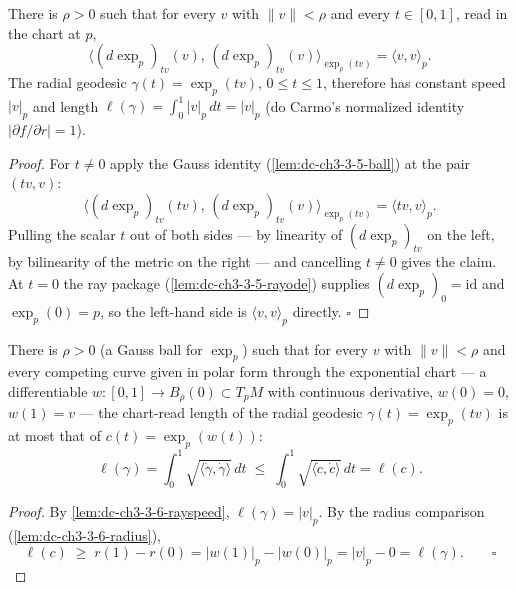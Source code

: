 \begin{lemma}
  \label{lem:dc-ch3-3-6-rayspeed}
  \leanok
  There is $\rho>0$ such that for every $v$ with $\|v\|<\rho$ and every
  $t\in[0,1]$, read in the chart at $p$,
  $$\big\langle(d\exp_p)_{tv}(v),\,(d\exp_p)_{tv}(v)\big\rangle_{\exp_p(tv)}
    =\langle v,v\rangle_p.$$
  The radial geodesic $\gamma(t)=\exp_p(tv)$, $0\le t\le1$, therefore has
  constant speed $|v|_p$ and length
  $\ell(\gamma)=\int_0^1|v|_p\,dt=|v|_p$ (do Carmo's normalized identity
  $|\partial f/\partial r|=1$).
\end{lemma}
\begin{proof}
  \leanok
  For $t\ne0$ apply the Gauss identity (\cref{lem:dc-ch3-3-5-ball}) at the
  pair $(tv,v)$:
  $$\big\langle(d\exp_p)_{tv}(tv),\,(d\exp_p)_{tv}(v)\big\rangle_{\exp_p(tv)}
    =\langle tv,v\rangle_p.$$
  Pulling the scalar $t$ out of both sides — by linearity of $(d\exp_p)_{tv}$
  on the left, by bilinearity of the metric on the right — and cancelling
  $t\ne0$ gives the claim. At $t=0$ the ray package
  (\cref{lem:dc-ch3-3-5-rayode}) supplies $(d\exp_p)_0=\mathrm{id}$ and
  $\exp_p(0)=p$, so the left-hand side is $\langle v,v\rangle_p$ directly.
  $\square$
\end{proof}

\begin{lemma}
  \label{lem:dc-ch3-3-6-ball}
  \leanok
  There is $\rho>0$ (a Gauss ball for $\exp_p$) such that for every $v$ with
  $\|v\|<\rho$ and every competing curve given in polar form through the
  exponential chart — a differentiable $w:[0,1]\to B_\rho(0)\subset T_pM$ with
  continuous derivative, $w(0)=0$, $w(1)=v$ — the chart-read length of the
  radial geodesic $\gamma(t)=\exp_p(tv)$ is at most that of
  $c(t)=\exp_p(w(t))$:
  $$\ell(\gamma)=\int_0^1\sqrt{\langle\dot\gamma,\dot\gamma\rangle}\,dt
    \;\le\;\int_0^1\sqrt{\langle\dot c,\dot c\rangle}\,dt=\ell(c).$$
\end{lemma}
\begin{proof}
  \leanok
  By \cref{lem:dc-ch3-3-6-rayspeed}, $\ell(\gamma)=|v|_p$. By the radius
  comparison (\cref{lem:dc-ch3-3-6-radius}),
  $$\ell(c)\;\ge\;r(1)-r(0)=|w(1)|_p-|w(0)|_p=|v|_p-0=\ell(\gamma).
    \qquad\square$$
\end{proof}

